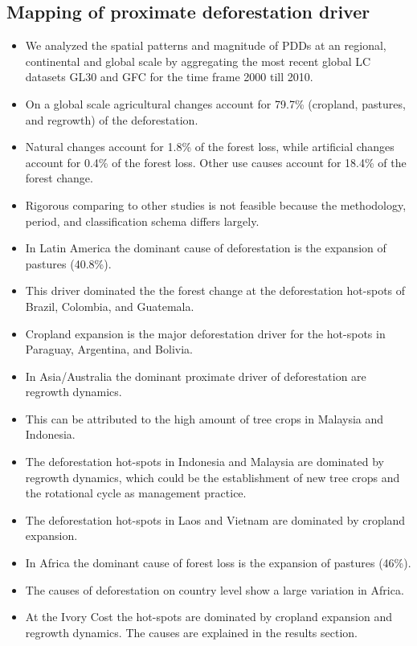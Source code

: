 		\subsection{Mapping of proximate deforestation driver}
		\label{subsec:discussion_proxy_deforestation_driver}
			\begin{itemize}
				\item We analyzed the spatial patterns and magnitude of PDDs at an regional, continental and global scale by aggregating the most recent global \ac{LC} datasets \ac{GL30} and \ac{GFC} for the time frame 2000 till 2010.
				\item On a global scale agricultural changes account for 79.7\% (cropland, pastures, and regrowth) of the deforestation.
				\item Natural changes account for 1.8\% of the forest loss, while artificial changes account for 0.4\% of the forest loss. Other use causes account for 18.4\% of the forest change.
				\item Rigorous comparing to other studies is not feasible because the methodology, period, and classification schema differs largely. 
				\item In Latin America the dominant cause of deforestation is the expansion of pastures (40.8\%). 
				\item This driver dominated the the forest change at the deforestation hot-spots of Brazil, Colombia, and Guatemala.
				\item Cropland expansion is the major deforestation driver for the hot-spots in Paraguay, Argentina, and Bolivia.
				\item In Asia/Australia the dominant proximate driver of deforestation are regrowth dynamics.
				\item This can be attributed to the high amount of tree crops in Malaysia and Indonesia.
				\item The deforestation hot-spots in Indonesia and Malaysia are dominated by regrowth dynamics, which could be the establishment of new tree crops and the rotational cycle as management practice.
				\item The deforestation hot-spots in Laos and Vietnam are dominated by cropland expansion.
				\item In Africa the dominant cause of forest loss is the expansion of pastures (46\%).
				\item The causes of deforestation on country level show a large variation in Africa.
				\item At the Ivory Cost the hot-spots are dominated by cropland expansion and regrowth dynamics. The causes are explained in the results section.

\end{itemize}
